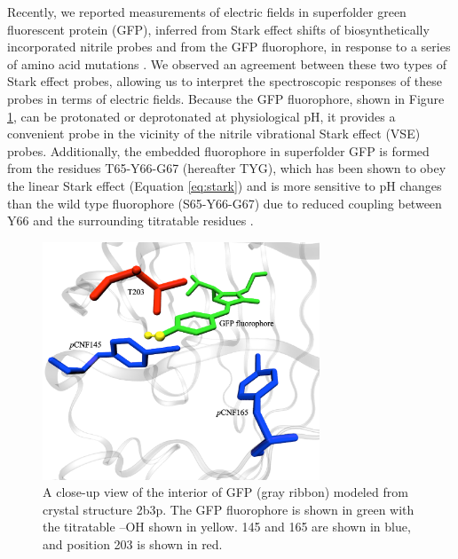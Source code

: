 Recently, we reported measurements of electric fields in superfolder green fluorescent protein (GFP), inferred from Stark effect shifts of biosynthetically incorporated nitrile probes and from the GFP fluorophore, in response to a series of amino acid mutations \cite{Slocum2016}.
We observed an agreement between these two types of Stark effect probes, allowing us to interpret the spectroscopic responses of these probes in terms of electric fields. 
Because the GFP fluorophore, shown in Figure \ref{fig:system}, can be protonated or deprotonated at physiological pH, it provides a convenient \pKa{} probe in the vicinity of the nitrile vibrational Stark effect (VSE) probes. 
Additionally, the embedded fluorophore in superfolder GFP is formed from the residues T65-Y66-G67 (hereafter TYG), which has been shown to obey the linear Stark effect\cite{Bublitz1998} (Equation \ref{eq:stark}) and is more sensitive to pH changes than the wild type fluorophore (S65-Y66-G67) due to reduced coupling between Y66 and the surrounding titratable residues \cite{Oltrogge2012, Brejc1997}.

\begin{figure}
    \center
    \includegraphics[width=3.25in]{figures-gfp-pKa/system.png}
    \caption{A close-up view of the interior of GFP (gray ribbon) modeled from crystal structure 2b3p. The GFP fluorophore is shown in green with the titratable --OH shown in yellow. \pCNF{} 145 and 165 are shown in blue, and position 203 is shown in red.}
    \label{fig:system}
\end{figure}

